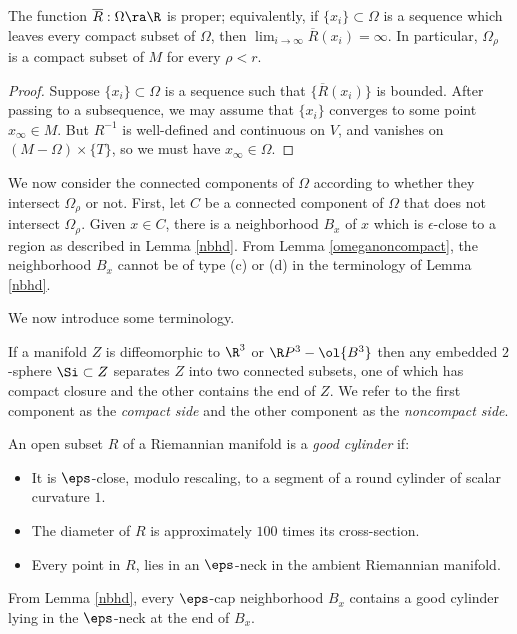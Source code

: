 \begin{lemma}
  \label{lem:kl-structure-at-first-singularity-time-characterization-structure-at-first-singularity-time}

\label{lemoverlinerisproper}
The function $\overline{R}:\Omega\ra \R$ is proper; equivalently,
if $\{x_i\}\subset \Omega$ is a sequence which leaves every compact
subset of $\Omega$, then $\lim_{i \rightarrow \infty} \overline{R}(x_i) = \infty$.
In particular,
$\Omega_\rho$ is a compact subset of $M$ for every $\rho<r$.
\end{lemma}
\begin{proof}
Suppose $\{x_i\}\subset \Omega$ is a sequence such that
$\{\overline{R}(x_i)\}$ is bounded.  After passing to a subsequence,
we may assume that $\{x_i\}$ converges to some point $x_\infty\in M$.
But $R^{-1}$ is well-defined and continuous on $V$, and vanishes on
$(M-\Omega)\times\{T\}$, so we must have $x_\infty\in \Omega$.
\end{proof}

We now consider the connected components of $\Omega$ according to whether
they intersect $\Omega_\rho$ or not. First, let $C$ be a connected component of
$\Omega$ that does not intersect $\Omega_\rho$.
Given $x \in C$, there is a neighborhood $B_x$ of $x$ which is $\epsilon$-close
to a region as described in Lemma \ref{nbhd}.
From Lemma \ref{omeganoncompact}, the neighborhood $B_x$ cannot be of
type (c) or (d) in the terminology of Lemma \ref{nbhd}.

We now introduce some terminology.

If a manifold $Z$ is diffeomorphic to $\R^3$ or $\R P^3-\ol{B^3}$
then any embedded $2$-sphere
$\Si\subset Z$ separates $Z$ into two connected subsets, one
of which has compact closure and the other contains the end
of $Z$. We refer to the first component as the {\em compact
side} and the other component as the {\em noncompact side}.

An open subset $R$ of a Riemannian manifold is a {\em good cylinder} if:

\begin{itemize}
\item It is
$\eps$-close, modulo rescaling, to a segment of a round
cylinder of scalar curvature $1$.

\item The diameter of $R$ is approximately
$100$ times its cross-section.

\item Every point in $R$, lies
in an $\eps$-neck in the ambient Riemannian manifold.
\end{itemize}
From Lemma \ref{nbhd},
every $\eps$-cap neighborhood $B_x$
contains a good cylinder lying in the $\eps$-neck at the end
of $B_x$.


